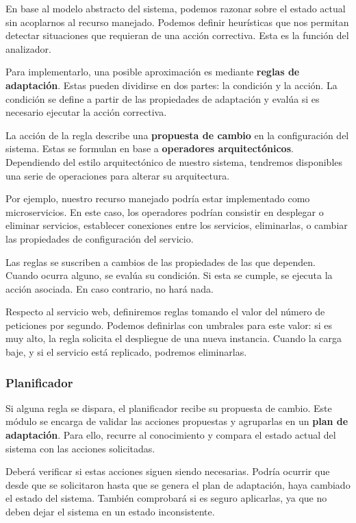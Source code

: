 En base al modelo abstracto del sistema, podemos razonar sobre el estado actual sin acoplarnos al recurso manejado. Podemos definir heurísticas que nos permitan detectar situaciones que requieran de una acción correctiva. Esta es la función del analizador.

Para implementarlo, una posible aproximación es mediante \textbf{reglas de adaptación}. Estas pueden dividirse en dos partes: la condición y la acción. La condición se define a partir de las propiedades de adaptación y evalúa si es necesario ejecutar la acción correctiva.

La acción de la regla describe una \textbf{propuesta de cambio} en la configuración del sistema. Estas se formulan en base a \textbf{operadores arquitectónicos}. \cite{garlanIncreasingSystemDependability2003} Dependiendo del estilo arquitectónico de nuestro sistema, tendremos disponibles una serie de operaciones para alterar su arquitectura.

Por ejemplo, nuestro recurso manejado podría estar implementado como microservicios. En este caso, los operadores podrían consistir en desplegar o eliminar servicios, establecer conexiones entre los servicios, eliminarlas, o cambiar las propiedades de configuración del servicio. \cite{fonsServiciosAdaptivereadyPara2021}

Las reglas se suscriben a cambios de las propiedades de las que dependen. Cuando ocurra alguno, se evalúa su condición. Si esta se cumple, se ejecuta la acción asociada. En caso contrario, no hará nada.

Respecto al servicio web, definiremos reglas tomando el valor del número de peticiones por segundo. Podemos definirlas con umbrales para este valor: si es muy alto, la regla solicita el despliegue de una nueva instancia. Cuando la carga baje, y si el servicio está replicado, podremos eliminarlas.

\subsubsection{Planificador}

Si alguna regla se dispara, el planificador recibe su propuesta de cambio. Este módulo se encarga de validar las acciones propuestas y agruparlas en un \textbf{plan de adaptación}. Para ello, recurre al conocimiento y compara el estado actual del sistema con las acciones solicitadas.

Deberá verificar si estas acciones siguen siendo necesarias. Podría ocurrir que desde que se solicitaron hasta que se genera el plan de adaptación, haya cambiado el estado del sistema. También comprobará si es seguro aplicarlas, ya que no deben dejar el sistema en un estado inconsistente.

